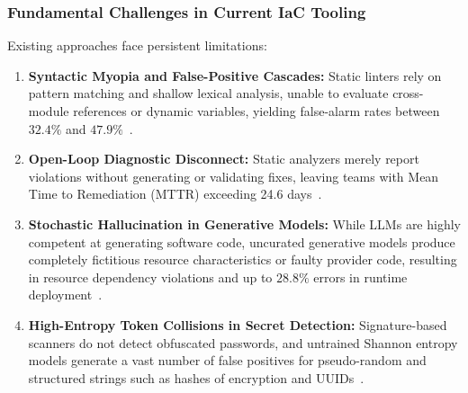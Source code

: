 \documentclass[runningheads]{llncs}
\begin{document}
\subsubsection{Fundamental Challenges in Current IaC Tooling}
Existing approaches face persistent limitations:
\begin{enumerate}
    \item \textbf{Syntactic Myopia and False-Positive Cascades:} Static linters rely on pattern matching and shallow lexical analysis, unable to evaluate cross-module references or dynamic variables, yielding false-alarm rates between $32.4\%$ and $47.9\%$~\cite{kumara2022evaluating}.
    \item \textbf{Open-Loop Diagnostic Disconnect:} Static analyzers merely report violations without generating or validating fixes, leaving teams with Mean Time to Remediation (MTTR) exceeding 24.6 days~\cite{borovits2023automatic}.
    \item \textbf{Stochastic Hallucination in Generative Models:} While LLMs are highly competent at generating software code, uncurated generative models produce completely fictitious resource characteristics or faulty provider code, resulting in resource dependency violations and up to $28.8\%$ errors in runtime deployment~\cite{pearce2023examining,jin2023inferfix}.
    \item \textbf{High-Entropy Token Collisions in Secret Detection:} Signature-based scanners do not detect obfuscated passwords, and untrained Shannon entropy models generate a vast number of false positives for pseudo-random and structured strings such as hashes of encryption and UUIDs~\cite{shannon1948mathematical}.
\end{enumerate}
\end{document}
